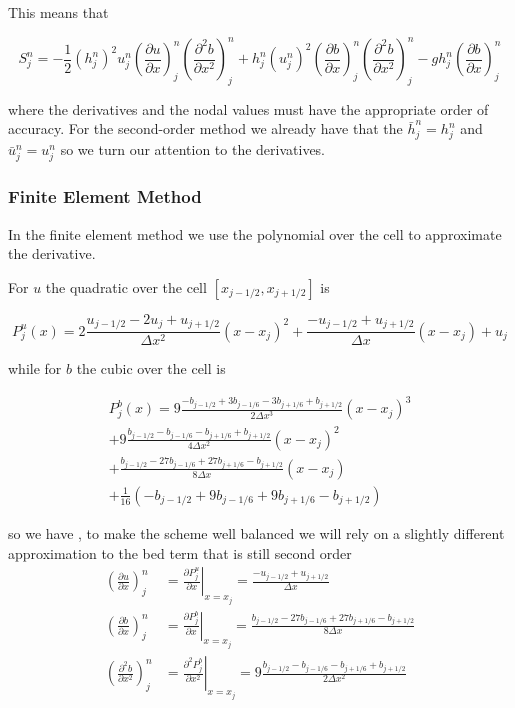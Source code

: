 This means that

\begin{equation}
 S^n_j = -\frac{1}{2}\left(h^n_j\right)^2 {u^n_j}\left( \frac{\partial {u}}{\partial x} \right)^n_j \left(\frac{\partial^2 b}{\partial x^2} \right)^n_j  + h^n_j \left(u^n_j\right)^2 \left(\frac{\partial b}{\partial x}\right)^n_j \left(\frac{\partial^2 b}{\partial x^2}\right)^n_j - gh^n_j\left(\frac{\partial b}{\partial x}\right)^n_j
\end{equation}

where the derivatives and the nodal values must have the appropriate order of accuracy. For the second-order method we already have that the $\bar{h}^n_j =h^n_j$ and $\bar{u}^n_j = u^n_j$ so we turn our attention to the derivatives.  

\subsubsection{Finite Element Method}
In the finite element method we use the polynomial over the cell to approximate the derivative.

For $u$ the quadratic over the cell $\left[x_{j-1/2}, x_{j+1/2}\right]$ is

\begin{equation}
P^u_j(x) = 2\frac{u_{j-1/2} - 2u_{j} + u_{j+1/2}}{\Delta x ^2} \left(x - x_j\right)^2 + \frac{-u_{j-1/2} + u_{j+1/2}}{\Delta x} \left(x - x_j\right) + u_j
\end{equation}

while for $b$ the cubic over the cell is

\begin{multline}
P^b_j(x)= 9\frac{-b_{j-1/2} + 3 b_{j-1/6} - 3 b_{j+1/6} + b_{j+1/2}}{2\Delta x^3} \left(x - x_j\right)^3 \\+  9\frac{b_{j-1/2} - b_{j-1/6} -  b_{j+1/6} + b_{j+1/2}}{4\Delta x^2} \left(x - x_j\right)^2 \\+  \frac{b_{j-1/2} - 27b_{j-1/6} + 27b_{j+1/6} - b_{j+1/2}}{8\Delta x} \left(x - x_j\right) \\  + \frac{1}{16}\left(-b_{j-1/2} + 9 b_{j-1/6} + 9b_{j+1/6} - b_{j+1/2}\right)
\end{multline}

so we have , to make the scheme well balanced we will rely on a slightly different approximation to the bed term that is still second order
\begin{align*}
\left( \frac{\partial {u}}{\partial x} \right)^n_j & = \left. \frac{\partial P^u_j}{\partial x} \right\rvert_{x= x_j} = \frac{-u_{j-1/2} + u_{j+1/2}}{\Delta x} \\
\left( \frac{\partial b}{\partial x} \right)^n_j &  = \left. \frac{\partial P^b_j}{\partial x} \right\rvert_{x= x_j} = \frac{b_{j-1/2} - 27b_{j-1/6} + 27b_{j+1/6} - b_{j+1/2}}{8\Delta x}  \\
\left( \frac{\partial^2 b}{\partial x^2} \right)^n_j & = \left. \frac{\partial^2 P^b_j}{\partial x^2} \right\rvert_{x= x_j} = 9\frac{b_{j-1/2} - b_{j-1/6} -  b_{j+1/6} + b_{j+1/2}}{2\Delta x^2} \\
\end{align*}


